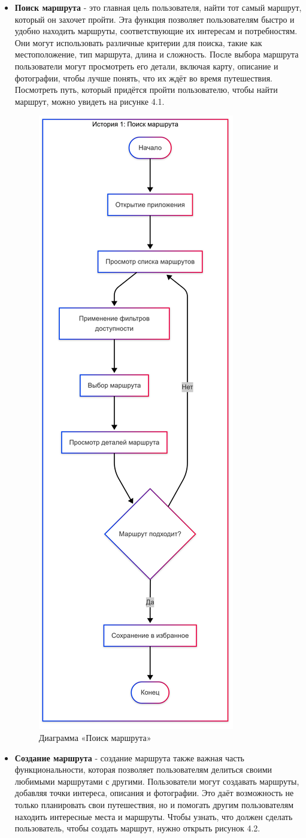 \begin{itemize}
    \item \textbf{Поиск маршрута} - это главная цель  пользователя, найти тот самый маршрут, который он захочет пройти. Эта функция позволяет пользователям быстро и удобно находить маршруты, соответствующие их интересам и потребностям. Они могут использовать различные критерии для поиска, такие как местоположение, тип маршрута, длина и сложность. После выбора маршрута пользователи могут просмотреть его детали, включая карту, описание и фотографии, чтобы лучше понять, что их ждёт во время путешествия. Посмотреть путь, который придётся пройти пользователю, чтобы найти маршрут, можно увидеть на рисунке 4.1.
    \begin{figure}[H]
        \centering
        \includegraphics[width=0.4\linewidth]{Images/mobile_logic/история_поиск_маршрута-2025-04-13-175239.png}
        \caption{Диаграмма «Поиск маршрута»}
        \label{fig:enter-label}
    \end{figure}
    \item \textbf{Создание маршрута} - создание маршрута также важная часть функциональности, которая позволяет пользователям делиться своими любимыми маршрутами с другими. Пользователи могут создавать маршруты, добавляя точки интереса, описания и фотографии. Это даёт возможность не только планировать свои путешествия, но и помогать другим пользователям находить интересные места и маршруты. Чтобы узнать, что должен сделать пользователь, чтобы создать маршрут, нужно открыть рисунок 4.2.

\end{itemize}
